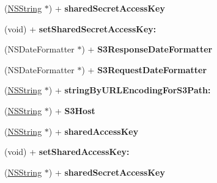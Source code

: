 \begin{DoxyCompactItemize}
\item 
\hypertarget{interface_a_s_i_s3_request_af1a72a1aacc05ce3f5def339d3bfbd5f}{
(\hyperlink{class_n_s_string}{\-N\-S\-String} $\ast$) + {\bfseries shared\-Secret\-Access\-Key}}
\label{interface_a_s_i_s3_request_af1a72a1aacc05ce3f5def339d3bfbd5f}

\item 
\hypertarget{interface_a_s_i_s3_request_aca8ba2305c0cbee1d7ec8553831768ff}{
(void) + {\bfseries set\-Shared\-Secret\-Access\-Key\-:}}
\label{interface_a_s_i_s3_request_aca8ba2305c0cbee1d7ec8553831768ff}

\item 
\hypertarget{interface_a_s_i_s3_request_ac0d60115b59954ffcc2e293c60321a74}{
(\-N\-S\-Date\-Formatter $\ast$) + {\bfseries \-S3\-Response\-Date\-Formatter}}
\label{interface_a_s_i_s3_request_ac0d60115b59954ffcc2e293c60321a74}

\item 
\hypertarget{interface_a_s_i_s3_request_ac2da1def71701c5ed345a2e119dad803}{
(\-N\-S\-Date\-Formatter $\ast$) + {\bfseries \-S3\-Request\-Date\-Formatter}}
\label{interface_a_s_i_s3_request_ac2da1def71701c5ed345a2e119dad803}

\item 
\hypertarget{interface_a_s_i_s3_request_aab8bdd9f5d8970a3bcfca36ec9dee9fb}{
(\hyperlink{class_n_s_string}{\-N\-S\-String} $\ast$) + {\bfseries string\-By\-U\-R\-L\-Encoding\-For\-S3\-Path\-:}}
\label{interface_a_s_i_s3_request_aab8bdd9f5d8970a3bcfca36ec9dee9fb}

\item 
\hypertarget{interface_a_s_i_s3_request_ae49e83f64fb2490185d0a9ff3649e1d3}{
(\hyperlink{class_n_s_string}{\-N\-S\-String} $\ast$) + {\bfseries \-S3\-Host}}
\label{interface_a_s_i_s3_request_ae49e83f64fb2490185d0a9ff3649e1d3}

\item 
\hypertarget{interface_a_s_i_s3_request_aadbf1f29ab30efc3f4640bac7b508d32}{
(\hyperlink{class_n_s_string}{\-N\-S\-String} $\ast$) + {\bfseries shared\-Access\-Key}}
\label{interface_a_s_i_s3_request_aadbf1f29ab30efc3f4640bac7b508d32}

\item 
\hypertarget{interface_a_s_i_s3_request_ad944a2a1b20fc9e4559c8faf4f41b977}{
(void) + {\bfseries set\-Shared\-Access\-Key\-:}}
\label{interface_a_s_i_s3_request_ad944a2a1b20fc9e4559c8faf4f41b977}

\item 
\hypertarget{interface_a_s_i_s3_request_af1a72a1aacc05ce3f5def339d3bfbd5f}{
(\hyperlink{class_n_s_string}{\-N\-S\-String} $\ast$) + {\bfseries shared\-Secret\-Access\-Key}}
\label{interface_a_s_i_s3_request_af1a72a1aacc05ce3f5def339d3bfbd5f}


\end{DoxyCompactItemize}
